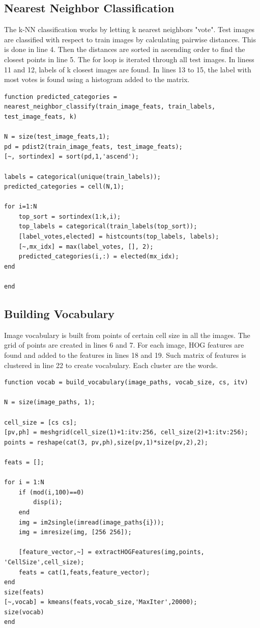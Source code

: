 \subsection{Nearest Neighbor Classification}
The k-NN classification works by letting k nearest neighbors "vote". Test images are classified with respect to train images by calculating pairwise distances. This is done in line 4. Then the distances are sorted in ascending order to find the closest points in line 5. The for loop is iterated through all test images. In liness 11 and 12, labels of k closest images are found. In lines 13 to 15, the label with most votes is found using a histogram added to the matrix.
\begin{lstlisting}[style=Matlab-editor]
function predicted_categories = nearest_neighbor_classify(train_image_feats, train_labels, test_image_feats, k)

N = size(test_image_feats,1);
pd = pdist2(train_image_feats, test_image_feats);
[~, sortindex] = sort(pd,1,'ascend');

labels = categorical(unique(train_labels));
predicted_categories = cell(N,1);

for i=1:N
	top_sort = sortindex(1:k,i);
	top_labels = categorical(train_labels(top_sort));
	[label_votes,elected] = histcounts(top_labels, labels);
	[~,mx_idx] = max(label_votes, [], 2);
	predicted_categories(i,:) = elected(mx_idx);
end

end
\end{lstlisting}

\subsection{Building Vocabulary}
Image vocabulary is built from points of certain cell size in all the images. The grid of points are created in lines 6 and 7. For each image, HOG features are found and added to the features in lines 18 and 19. Such matrix of features is clustered in line 22 to create vocabulary. Each cluster are the words.
\begin{lstlisting}[style=Matlab-editor]
function vocab = build_vocabulary(image_paths, vocab_size, cs, itv)

N = size(image_paths, 1);

cell_size = [cs cs];
[pv,ph] = meshgrid(cell_size(1)+1:itv:256, cell_size(2)+1:itv:256);
points = reshape(cat(3, pv,ph),size(pv,1)*size(pv,2),2);

feats = [];

for i = 1:N
	if (mod(i,100)==0)
		disp(i);
	end
	img = im2single(imread(image_paths{i}));
	img = imresize(img, [256 256]);
	
	[feature_vector,~] = extractHOGFeatures(img,points, 'CellSize',cell_size);
	feats = cat(1,feats,feature_vector);
end
size(feats)
[~,vocab] = kmeans(feats,vocab_size,'MaxIter',20000);
size(vocab)
end
\end{lstlisting}
